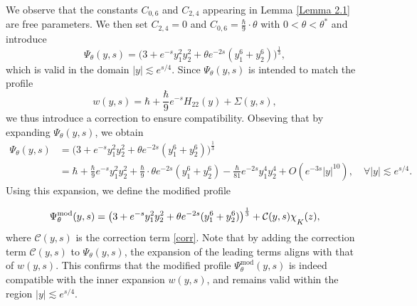 \documentclass[11pt,reqno]{amsart}
\theoremstyle{definition}
\theoremstyle{bfremark}
\numberwithin{equation}{section}
\newcommand{\mchi}{\raisebox{0pt}[1ex][1ex]{$\chi$}}
\begin{document}
\medskip

We observe that the constants \(C_{0,6}\) and $C_{2,4}$ appearing in Lemma \ref{Lemma 2.1} are free parameters. We then set $C_{2,4} = 0$ and \(C_{0,6} =\frac{\hbar}{9} \cdot \theta\) with \(0<\theta < \theta^*\) and introduce
\[
    \Psi_{\theta}(y, s) = \Big(3 + e^{-s} y_1^2 y_2^2 + \theta e^{-2s} (y_1^6 + y_2^6) \Big)^{\frac{1}{3}},
\]
which is valid in the domain \(|y| \lesssim e^{s/4} \). Since \(\Psi_{\theta}(y,s)\) is intended to match the profile
\[
    w(y,s) = \hbar + \frac{\hbar}{9} e^{-s} H_{22}(y) + \Sigma(y,s),
\]
we thus introduce a correction to ensure compatibility. Obseving that by expanding \(\Psi_{\theta}(y,s)\), we obtain
\begin{align*}
    \Psi_{\theta}(y,s) & = \Big(3 + e^{-s} y_1^2 y_2^2 + \theta e^{-2s} (y_1^6 + y_2^6) \Big)^{\frac{1}{3}} \\
    &= \hbar + \frac{\hbar}{9} e^{-s} y_1^2 y_2^2 
       + \frac{\hbar}{9} \cdot \theta e^{-2s} (y_1^6 + y_2^6) 
       - \frac{\hbar}{81} e^{-2s} y_1^4 y_2^4 
       + O(e^{-3s} |y|^{10}), \quad \forall |y| \lesssim e^{s/4}.
\end{align*}
Using this expansion, we define the modified profile

\[
    \Psi_{\theta}^{\mathrm{mod}}(y,s) = \left(3 + e^{-s} y_1^2 y_2^2 + \theta e^{-2s} (y_1^6 + y_2^6)\right)^{\frac{1}{3}} + \mathcal{C}(y,s)\mchi_K(z),
\]
where \(\mathcal{C}(y,s)\) is the correction term \ref{corr}. Note that by adding the correction term \(\mathcal{C}(y,s)\) to \(\Psi_{\theta}(y,s)\), the expansion of the leading terms aligns with that of \(w(y,s)\). This confirms that the modified profile \(\Psi_{\theta}^{\mathrm{mod}}(y,s)\) is indeed compatible with the inner expansion \(w(y,s)\), and remains valid within the region \( |y| \lesssim e^{s/4}\).
\end{document}
